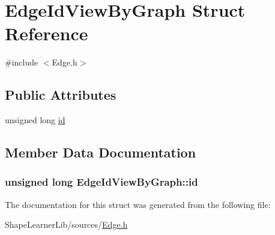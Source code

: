 \hypertarget{struct_edge_id_view_by_graph}{}\section{Edge\+Id\+View\+By\+Graph Struct Reference}
\label{struct_edge_id_view_by_graph}


{\ttfamily \#include $<$Edge.\+h$>$}

\subsection*{Public Attributes}
\begin{DoxyCompactItemize}
\item 
unsigned long \hyperlink{struct_edge_id_view_by_graph_ab6b732a7c17b45291f3dbb03b309d0a3}{id}
\end{DoxyCompactItemize}


\subsection{Member Data Documentation}
\hypertarget{struct_edge_id_view_by_graph_ab6b732a7c17b45291f3dbb03b309d0a3}{}
\subsubsection[{id}]{\setlength{\rightskip}{0pt plus 5cm}unsigned long Edge\+Id\+View\+By\+Graph\+::id}\label{struct_edge_id_view_by_graph_ab6b732a7c17b45291f3dbb03b309d0a3}


The documentation for this struct was generated from the following file\+:\begin{DoxyCompactItemize}
\item 
Shape\+Learner\+Lib/sources/\hyperlink{_edge_8h}{Edge.\+h}\end{DoxyCompactItemize}

